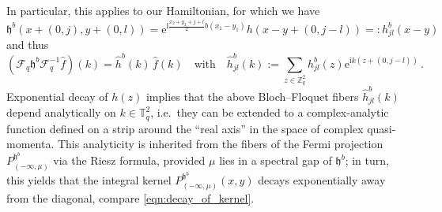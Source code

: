 \documentclass[a4paper]{article}
\newcommand{\T}{\mathbb{T}}
\newcommand{\e}{\mathrm{e}}
\renewcommand{\i}{\mathrm{i}}
\newcommand{\Z}{\mathbb{Z}}
\theoremstyle{plain}
\theoremstyle{definition}
\theoremstyle{remark}
\renewcommand{\(}{\left(}
\renewcommand{\)}{\right)}
\begin{document}
In particular, this applies to our Hamiltonian, for which we have
\[ \mathfrak{h}^b(x+(0,j),y+(0,l)) = \mathrm{e}^{ \mathrm{i}\frac{x_2+y_2+ j+l}{2} b (x_1-y_1)} h(x-y+(0,j-l)) =: h^b_{jl}(x-y)\]
and thus 
\[
(\mathcal{F}_q\mathfrak{h}^b\mathcal{F}^{-1}_q \hat f)(k)  = \hat h^b(k) \,\hat f (k)\quad\mbox{with}\quad 
\hat h^b_{jl}(k) := 
    \sum_{z\in\Z^2_q}    h^b_{jl}(z)\e^{ \i k  (z+(0,j-l)) }  \,.
\]
Exponential decay of $h(z)$ implies that the above Bloch--Floquet fibers $\hat h^b_{jl}(k)$ depend analytically on $k \in \T^2_q$, i.e.\ they can be extended to a complex-analytic function defined on a strip around the ``real axis'' in the space of complex quasi-momenta. This analyticity is inherited from the fibers of the Fermi projection $P^{\mathfrak{h}^b}_{(-\infty,\mu)}$  via the Riesz formula, provided $\mu$ lies in a spectral gap of $\mathfrak{h}^b$; in turn, this yields that the integral kernel $P^{\mathfrak{h}^b}_{(-\infty,\mu)}(x,y)$ decays exponentially away from the diagonal, compare \eqref{eqn:decay_of_kernel}.
\end{document}

